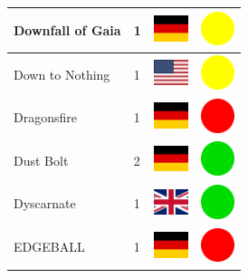 \documentclass[12pt, a4paper, twoside]{report}
\begin{document}
\begin{center}
\begin{longtable}{|p{5cm}|p{2cm}|p{2cm}|p{2cm}|}
			Downfall of Gaia & 1 & \includegraphics[width=1cm]{4x3/de} & \includegraphics[width=1cm]{likes/m} \\ \hline
			Down to Nothing & 1 & \includegraphics[width=1cm]{4x3/us} & \includegraphics[width=1cm]{likes/m} \\ \hline
			Dragonsfire & 1 & \includegraphics[width=1cm]{4x3/de} & \includegraphics[width=1cm]{likes/n} \\ \hline
			Dust Bolt & 2 & \includegraphics[width=1cm]{4x3/de} & \includegraphics[width=1cm]{likes/y} \\ \hline
			Dyscarnate & 1 & \includegraphics[width=1cm]{4x3/gb} & \includegraphics[width=1cm]{likes/y} \\ \hline
			EDGEBALL & 1 & \includegraphics[width=1cm]{4x3/de} & \includegraphics[width=1cm]{likes/n} \\ \hline

\end{longtable}
\end{center}
\end{document}
